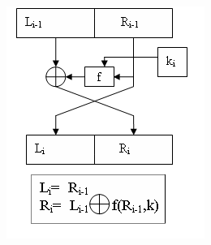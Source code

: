 \documentclass[a4paper,12pt]{article}
\newenvironment{Figure}
	{\par\medskip\noindent\minipage{\linewidth}}
	{\endminipage\par\medskip}
\begin{document}
		
	\begin{multicols}{2}
        \begin{Figure}
			\centering
			\includegraphics[width=\linewidth]{round.png}
		\end{Figure}


\end{multicols}
\end{document}
